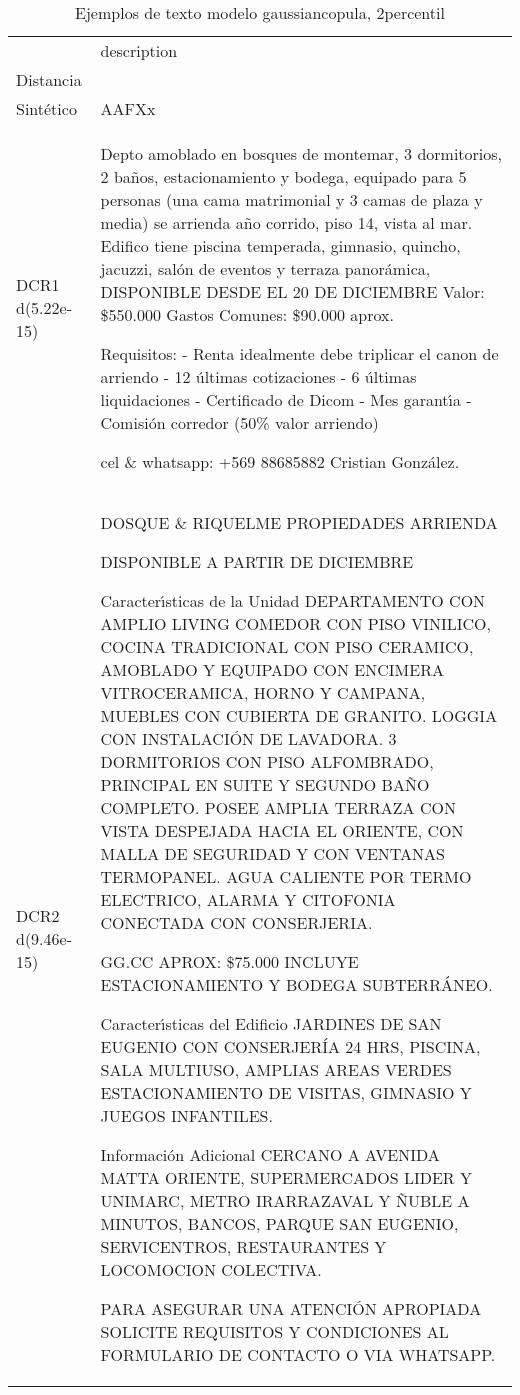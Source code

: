 \begin{table}[H]
\centering
\fontsize{10}{14}\selectfont
\caption{Ejemplos de texto modelo gaussiancopula, 2percentil}
\label{table-example-economicos-b-2-gaussiancopula-2p-text}
\begin{tabular}{|l|m{35em}|}
\hline
\rowcolor[gray]{0.8}
 & description \\
Distancia &  \\
\hline Sintético & AAFXx \\
\hline DCR1 d(5.22e-15) & Depto amoblado en bosques de montemar, 3 dormitorios, 2 ba\~nos, estacionamiento y bodega, equipado para 5 personas (una cama matrimonial y 3 camas de plaza y media) se arrienda a\~no corrido, piso 14, vista al mar.
Edifico tiene piscina temperada, gimnasio, quincho, jacuzzi, sal\'on de eventos y terraza panor\'amica, 
DISPONIBLE DESDE EL 20 DE DICIEMBRE
Valor: \$550.000
Gastos Comunes: \$90.000 aprox.

Requisitos:
- Renta idealmente debe triplicar el canon de arriendo 
- 12 \'ultimas cotizaciones
- 6 \'ultimas liquidaciones
- Certificado de Dicom
- Mes garant{\'\i}a
- Comisi\'on corredor (50\% valor arriendo)

cel \& whatsapp: +569 88685882
Cristian Gonz\'alez.
 \\
\hline DCR2 d(9.46e-15) & DOSQUE \& RIQUELME PROPIEDADES ARRIENDA

DISPONIBLE A PARTIR DE DICIEMBRE

Caracter{\'\i}sticas de la Unidad
DEPARTAMENTO CON AMPLIO LIVING COMEDOR CON PISO VINILICO, COCINA TRADICIONAL CON PISO CERAMICO, AMOBLADO Y EQUIPADO CON ENCIMERA VITROCERAMICA, HORNO Y CAMPANA, MUEBLES CON CUBIERTA DE GRANITO. LOGGIA CON INSTALACI\'ON DE LAVADORA. 3 DORMITORIOS CON PISO ALFOMBRADO, PRINCIPAL EN SUITE Y SEGUNDO BA\~NO COMPLETO. POSEE AMPLIA TERRAZA CON VISTA DESPEJADA HACIA EL ORIENTE, CON MALLA DE SEGURIDAD Y CON VENTANAS TERMOPANEL. AGUA CALIENTE POR TERMO ELECTRICO, ALARMA Y CITOFONIA CONECTADA CON CONSERJERIA.

GG.CC APROX: \$75.000
INCLUYE ESTACIONAMIENTO Y BODEGA SUBTERR\'ANEO.

Caracter{\'\i}sticas del Edificio
JARDINES DE SAN EUGENIO CON CONSERJER\'IA 24 HRS, PISCINA, SALA MULTIUSO, AMPLIAS AREAS VERDES ESTACIONAMIENTO DE VISITAS, GIMNASIO Y JUEGOS INFANTILES.

Informaci\'on Adicional
CERCANO A AVENIDA MATTA ORIENTE, SUPERMERCADOS LIDER Y UNIMARC, METRO IRARRAZAVAL Y \~NUBLE A MINUTOS, BANCOS, PARQUE SAN EUGENIO, SERVICENTROS, RESTAURANTES Y LOCOMOCION COLECTIVA.

PARA ASEGURAR UNA ATENCI\'ON APROPIADA SOLICITE REQUISITOS Y CONDICIONES AL FORMULARIO DE CONTACTO O VIA WHATSAPP.  
 \\
\hline
\end{tabular}
\end{table}
